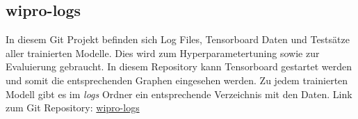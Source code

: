 \subsection{wipro-logs}
\label{sub:wipro-logs}
In diesem Git Projekt befinden sich Log Files, Tensorboard Daten und Testsätze aller trainierten
Modelle. Dies wird zum Hyperparametertuning sowie zur Evaluierung gebraucht. In diesem Repository kann Tensorboard
gestartet werden und somit die entsprechenden Graphen eingesehen werden. Zu jedem trainierten Modell gibt es im
\textit{logs} Ordner ein entsprechende Verzeichnis mit den Daten.
\newline
Link zum Git Repository: \hyperlink{https://gitlab.enterpriselab.ch/Pwn3rs/wipro-logs}{wipro-logs}
\newline
{}
